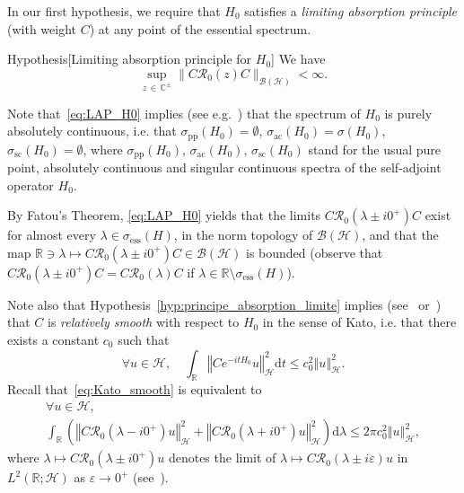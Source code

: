 \documentclass[AHL,Unicode,longabstracts,published]{cedram}
\newcommand{\Hi}{\mathcal{H}}
\newcommand{\bbC}{\mathbb{C}}
\newcommand{\R}{\mathbb{R}}
\newcommand{\ess}{\mathrm{ess}}
\newcommand{\acr}{\mathrm{ac}}
\newcommand{\rmd}{\mathrm{d}}
\newcommand{\norme}[1]{\left\Vert #1\right\Vert}
\newcommand{\Res}{\mathcal{R}}
\newcommand{\clB}{\mathcal{B}}
\let\oldforall\forall
\renewcommand*{\forall}{\mathrel{\oldforall}}
\newcommand*\bbC{\mathbb{C}}
\newcommand{\Hi}{\mathcal{H}}
\newcommand{\R}{\mathbb{R}}
\newcommand{\ess}{\mathrm{ess}}
\newcommand{\acr}{\mathrm{ac}}
\begin{document}
In our first hypothesis, we require that $H_0$ satisfies a \emph{limiting absorption principle} (with weight $C$) at any point of the essential spectrum.


\begin{enonce}{Hypothesis}[Limiting absorption principle for $H_0$]\label{hyp:principe_absorption_limite}
We have
\begin{equation}\label{eq:LAP_H0}
\sup_{z\,\in\,\bbC^\pm}\big\|C\Res_0(z)C\big\|_{\clB(\Hi)}<\infty.
\end{equation}
\end{enonce}


Note that~\eqref{eq:LAP_H0} implies (see e.g.~\cite[Proposition~4.1]{CFKS}) that the spectrum of $H_0$ is purely absolutely continuous, i.e. that $\sigma_{\mathrm{pp}}(H_0)=\emptyset$, $\sigma_{\acr}(H_0)=\sigma(H_0)$, $\sigma_{\mathrm{sc}}(H_0)=\emptyset$, where $\sigma_{\mathrm{pp}}(H_0)$, $\sigma_{\acr}(H_0)$, $\sigma_{\mathrm{sc}}(H_0)$ stand for the usual pure point, absolutely continuous and singular continuous spectra of the self-adjoint operator $H_0$.

By Fatou's Theorem, \eqref{eq:LAP_H0} yields that the limits $C\Res_0(\lambda\pm i0^+)C$ exist for almost every $\lambda\in\sigma_{\ess}(H)$, in the norm topology of $\clB(\Hi)$, and that the map $\R\ni\lambda\mapsto C\Res_0(\lambda\pm i0^+)C\in\clB(\Hi)$ is bounded (observe that $C\Res_0(\lambda\pm i0^+)C=C\Res_0(\lambda)C$ if $\lambda\in\R\setminus\sigma_{\ess}(H)$).

Note also that Hypothesis~\ref{hyp:principe_absorption_limite} implies (see~\cite{Ka65_01} or~\cite[Theorem~XIII.25 and its corollary]{ReSi80_01}) that $C$ is \emph{relatively smooth} with respect to $H_0$ in the sense of Kato, i.e. that there exists a constant $c_0$ such that
\begin{equation}\label{eq:Kato_smooth}
\forall u\in\Hi, \quad \int_\R\norme{Ce^{-itH_0}u}_\Hi^2\rmd t\leq c_0^2\norme{u}_\Hi^2.
\end{equation}
Recall that~\eqref{eq:Kato_smooth} is equivalent to
\begin{multline}\label{eq:Smooth_Ka65_01}
\forall u\in\Hi, \\ \int_\R\left(\norme{C\Res_0\left(\lambda-i0^+\right)u}_\Hi^2+\norme{C\Res_0\left(\lambda+i0^+\right)u}_\Hi^2\right)\rmd \lambda\leq 2\pi c_0^2\norme{u}_\Hi^2,
\end{multline}
where $\lambda\mapsto C\Res_0(\lambda\pm i0^+)u$ denotes the limit of $\lambda\mapsto C\Res_0(\lambda\pm i\varepsilon)u$ in $L^2(\R;\Hi)$ as $\varepsilon\to0^+$ (see~\cite{Ka65_01}).
\end{document}
